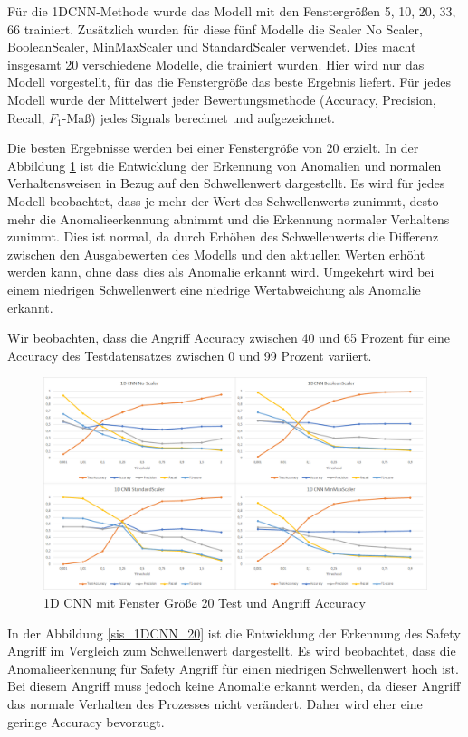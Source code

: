 \documentclass[12pt,a4paper]{scrartcl}
\numberwithin{equation}{section}
\begin{document}
Für die 1DCNN-Methode wurde das Modell mit den Fenstergrößen 5, 10, 20, 33, 66 trainiert. Zusätzlich wurden für diese fünf Modelle die Scaler No Scaler, BooleanScaler, MinMaxScaler und StandardScaler verwendet. Dies macht insgesamt 20 verschiedene Modelle, die trainiert wurden. Hier wird nur das Modell vorgestellt, für das die Fenstergröße das beste Ergebnis liefert. Für jedes Modell wurde der Mittelwert jeder Bewertungsmethode (Accuracy, Precision, Recall, $F_{1}$-Maß) jedes Signals berechnet und aufgezeichnet.

Die besten Ergebnisse werden bei einer Fenstergröße von 20 erzielt. In der Abbildung \ref{1DCNN_20} ist die Entwicklung der Erkennung von Anomalien und normalen Verhaltensweisen in Bezug auf den Schwellenwert dargestellt. Es wird für jedes Modell beobachtet, dass je mehr der Wert des Schwellenwerts zunimmt, desto mehr die Anomalieerkennung abnimmt und die Erkennung normaler Verhaltens zunimmt. Dies ist normal, da durch Erhöhen des Schwellenwerts die Differenz zwischen den Ausgabewerten des Modells und den aktuellen Werten erhöht werden kann, ohne dass dies als Anomalie erkannt wird. Umgekehrt wird bei einem niedrigen Schwellenwert eine niedrige Wertabweichung als Anomalie erkannt.

Wir beobachten, dass die Angriff Accuracy zwischen 40 und 65 Prozent für eine Accuracy des Testdatensatzes zwischen 0 und 99 Prozent variiert. 

\begin{figure}[ht!]
	\centering
	  \includegraphics[scale=0.5]{1DCNN_20.png}
	  \caption{1D CNN mit Fenster Größe 20 Test und Angriff Accuracy}
	\label{1DCNN_20}
\end{figure}

In der Abbildung \ref{sis_1DCNN_20} ist die Entwicklung der Erkennung des Safety Angriff im Vergleich zum Schwellenwert dargestellt. Es wird beobachtet, dass die Anomalieerkennung für Safety Angriff für einen niedrigen Schwellenwert hoch ist. Bei diesem Angriff muss jedoch keine Anomalie erkannt werden, da dieser Angriff das normale Verhalten des Prozesses nicht verändert. Daher wird eher eine geringe Accuracy bevorzugt. 
\end{document}
